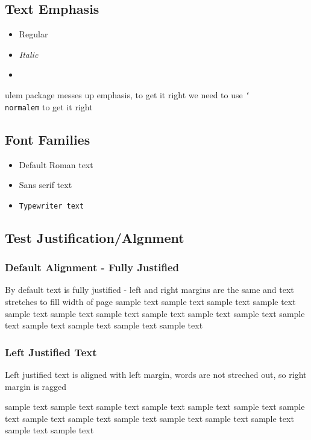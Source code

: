 \documentclass{article}
\begin{document}
\subsection{Text Emphasis}
\begin{itemize}
    \item Regular 
    \item \textit{Italic }
    \item {}
\end{itemize}
ulem package messes up emphasis, to get it right we need to use \texttt{\char`\\normalem} to get it right
\subsection{Font Families}
\begin{itemize}
    \item \textrm{Default Roman text}
    \item \textsf{Sans serif text}
    \item \texttt{Typewriter text}
\end{itemize}
\subsection{Test Justification/Algnment}
\subsubsection{Default Alignment - Fully Justified}
By default text is fully justified - left and right margins are the same and text stretches to fill width of page
\medskip
sample text sample text sample text sample text sample text sample text sample text sample text sample text sample text sample text sample text sample text sample text sample text 
\subsubsection{Left Justified Text}
\begin{flushleft}
    Left justified text is aligned with left margin, words are not streched out, so right margin is ragged
    
    \medskip
sample text sample text sample text sample text sample text sample text sample text sample text sample text sample text sample text sample text sample text sample text sample text 
\end{flushleft}
\end{document}
